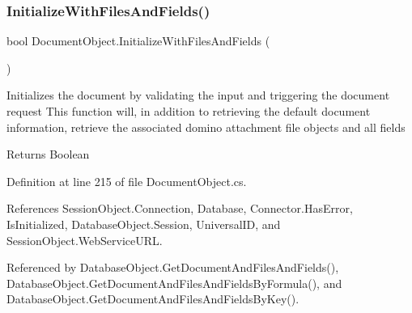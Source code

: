 \subsubsection{\texorpdfstring{Initialize\+With\+Files\+And\+Fields()}{InitializeWithFilesAndFields()}\hspace{0.1cm}{\footnotesize\ttfamily [1/2]}}
{\footnotesize\ttfamily bool Document\+Object.\+Initialize\+With\+Files\+And\+Fields (\begin{DoxyParamCaption}{ }\end{DoxyParamCaption})}



Initializes the document by validating the input and triggering the document request This function will, in addition to retrieving the default document information, retrieve the associated domino attachment file objects and all fields 

\begin{DoxyReturn}{Returns}
Boolean
\end{DoxyReturn}


Definition at line 215 of file Document\+Object.\+cs.



References Session\+Object.\+Connection, Database, Connector.\+Has\+Error, Is\+Initialized, Database\+Object.\+Session, Universal\+ID, and Session\+Object.\+Web\+Service\+U\+RL.



Referenced by Database\+Object.\+Get\+Document\+And\+Files\+And\+Fields(), Database\+Object.\+Get\+Document\+And\+Files\+And\+Fields\+By\+Formula(), and Database\+Object.\+Get\+Document\+And\+Files\+And\+Fields\+By\+Key().



